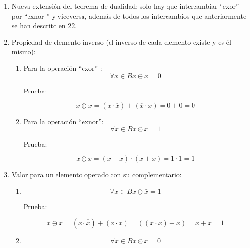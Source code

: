 \documentclass[
]{article}
\providecommand{\tightlist}{%
  \setlength{\itemsep}{0pt}\setlength{\parskip}{0pt}}
\begin{document}
\begin{enumerate}
\begin{enumerate}
\begin{enumerate}
      \begin{enumerate}
      \def\labelenumiv{\arabic{enumiv}.}
      \tightlist
      \item
        Definición del operador ``exor'':
        \[{x \oplus y}{: =}{{{({x \cdot \bar{y}})} + {({\bar{x} \cdot y})}} = {{({x + y})} \cdot {({\bar{x} + \bar{y}})}}}\]
      \item
        Definición del operador ``exnor'':
        \[{x \odot y}{: =}{{{({x + \bar{y}})} \cdot {({\bar{x} + y})}} = {{({x \cdot y})} + {({\bar{x} \cdot \bar{y}})}}}\]
      \end{enumerate}
    \item
      Nueva extensión del teorema de dualidad: solo hay que intercambiar
      ``exor'' por ``ex\-nor '' y viceversa, además de todos los
      intercambios que anteriormente se han des\-crito en 22.
    \item
      Propiedad de elemento inverso (el inverso de cada elemento existe
      y es él mismo):

      \begin{enumerate}
      \def\labelenumiv{\arabic{enumiv}.}
      \item
        Para la operación ``exor'' :
        \[\forall{x \in B}x \oplus {x = 0}\]

        Prueba:

        \[x \oplus {{{x = {{({x \cdot \overline{x}})} + {({\overline{x} \cdot x})}}} = {0 + 0}} = 0}\]
      \item
        Para la operación ``exnor'': \[\forall{x \in B}x \odot {x = 1}\]

        Prueba:

        \[x \odot {{{x = {{({x + \overline{x}})} \cdot {({\overline{x} + x})}}} = {1 \cdot 1}} = 1}\]
      \end{enumerate}
    \item
      Valor para un elemento operado con su complementario:

      \begin{enumerate}
      \def\labelenumiv{\arabic{enumiv}.}
      \item
        \[\forall{x \in B}x \oplus {\bar{x} = 1}\]

        Prueba:

        \[x \oplus {{{{\bar{x} = {{({x \cdot \overline{\overline{x}}})} + {({\overline{x} \cdot \overline{x}})}}} = {({{({x \cdot x})} + \overline{x}})}} = {x + \overline{x}}} = 1}\]
      \item
        \[\forall{x \in B}x \odot {\bar{x} = 0}\]


\end{enumerate}
\end{enumerate}
\end{enumerate}
\end{enumerate}
\end{document}
